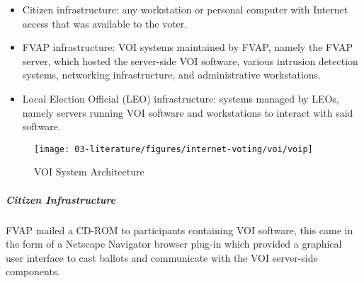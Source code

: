 \begin{itemize}
  \item Citizen infrastructure: any workstation or personal computer with
    Internet access that was available to the voter.

  \item FVAP infrastructure: VOI systems maintained by FVAP, namely the FVAP
    server, which hosted the server-side VOI software, various intrusion
    detection systems, networking infrastructure, and administrative
    workstations.

  \item Local Election Official (LEO) infrastructure: systems managed by
    LEOs, namely servers running VOI software and workstations to interact with
    said software.
\end{itemize}

\begin{figure}[H]
    \centering
    \texttt{[image: 03-literature/figures/internet-voting/voi/voip]}
    \caption{VOI System Architecture~\cite{voi-assessment-report}}\label{fig:voi-architecture}%
\end{figure}

\subparagraph{Citizen Infrastructure}
FVAP mailed a CD-ROM to participants containing VOI software, this came in the
form of a Netscape Navigator browser plug-in which provided a graphical user
interface to cast ballots and communicate with the VOI server-side components.


